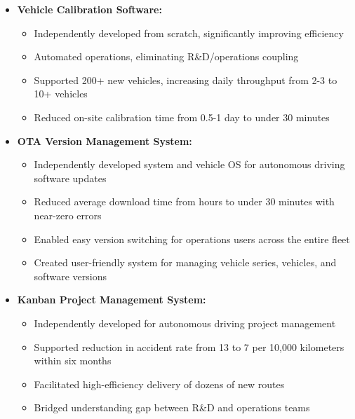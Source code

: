 
  \begin{itemize}
    \item \textbf{Vehicle Calibration Software:}
      \begin{itemize}
        \item Independently developed from scratch, significantly improving efficiency
        \item Automated operations, eliminating R&D/operations coupling
        \item Supported 200+ new vehicles, increasing daily throughput from 2-3 to 10+ vehicles
        \item Reduced on-site calibration time from 0.5-1 day to under 30 minutes
      \end{itemize}
    \item \textbf{OTA Version Management System:}
      \begin{itemize}
        \item Independently developed system and vehicle OS for autonomous driving software updates
        \item Reduced average download time from hours to under 30 minutes with near-zero errors
        \item Enabled easy version switching for operations users across the entire fleet
        \item Created user-friendly system for managing vehicle series, vehicles, and software versions
      \end{itemize}
    \item \textbf{Kanban Project Management System:}
      \begin{itemize}
        \item Independently developed for autonomous driving project management
        \item Supported reduction in accident rate from 13 to 7 per 10,000 kilometers within six months
        \item Facilitated high-efficiency delivery of dozens of new routes
        \item Bridged understanding gap between R&D and operations teams
      \end{itemize}
  \end{itemize}